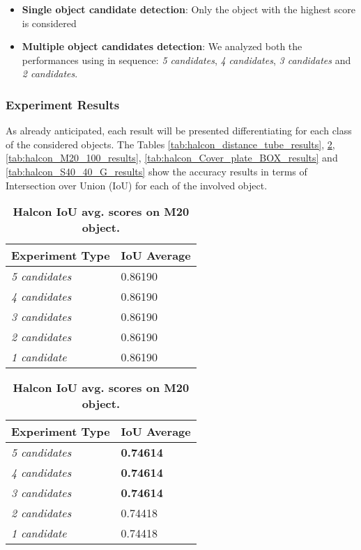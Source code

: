 \begin{itemize}
	\item \textbf{Single object candidate detection}: Only the object with the highest score is considered
	\item \textbf{Multiple object candidates detection}: We analyzed both the performances using in sequence: \emph{5 candidates}, \emph{4 candidates}, \emph{3 candidates} and \emph{2 candidates}.
\end{itemize}

\subsubsection{Experiment Results}
As already anticipated, each result will be presented differentiating for each class of the considered objects. The Tables \ref{tab:halcon_distance_tube_results}, \ref{tab:halcon_M20_results}, \ref{tab:halcon_M20_100_results}, \ref{tab:halcon_Cover_plate_BOX_results} and \ref{tab:halcon_S40_40_G_results} show the accuracy results in terms of Intersection over Union (IoU) for each of the involved object.

\begin{table}[!hbt]
\parbox{.45\linewidth}{
	\centering
    \begin{tabular}{| l | l |}
    \hline
    \textbf{Experiment Type} & \textbf{IoU Average} \\ \hline
    \emph{5 candidates} & 0.86190 \\
    \emph{4 candidates} & 0.86190 \\
    \emph{3 candidates} & 0.86190 \\
    \emph{2 candidates} & 0.86190 \\
    \emph{1 candidate} & 0.86190 \\
    \hline
    \end{tabular}
    \caption{\textbf{Halcon IoU avg. scores on Distance\_tube object.}}
    \label{tab:halcon_distance_tube_results}
}
\hfill
\parbox{.45\linewidth}{
	\centering
    \begin{tabular}{| l | l |}
    \hline
    \textbf{Experiment Type} & \textbf{IoU Average} \\ \hline
    \emph{5 candidates} & \textbf{0.74614} \\
    \emph{4 candidates} & \textbf{0.74614} \\
    \emph{3 candidates} & \textbf{0.74614} \\
    \emph{2 candidates} & 0.74418\\
    \emph{1 candidate} & 0.74418\\
    \hline
    \end{tabular}
    \caption{\textbf{Halcon IoU avg. scores on M20 object.}}
    \label{tab:halcon_M20_results}
}
\end{table}


